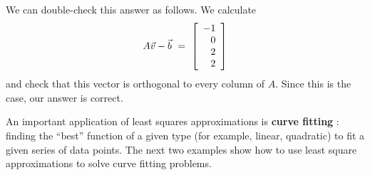 \documentclass{ximera}
\begin{document}
\begin{example}
  We can double-check this answer as
  follows. We calculate
  \begin{equation*}
    A\vect{v} - \vect{b}
    ~=~ \startmat{r} -1 \\ 0 \\ 2 \\ 2 \stopmat
  \end{equation*}
  and check that this vector is orthogonal to every column of
  $A$. Since this is the case, our answer is correct.
\end{example}

An important application of least squares approximations is
\textbf{curve fitting}%
%
: finding the ``best'' function of a given type
(for example, linear, quadratic) to fit a given series of data points.
The next two examples show how to use least square approximations to
solve curve fitting problems.
\end{document}
